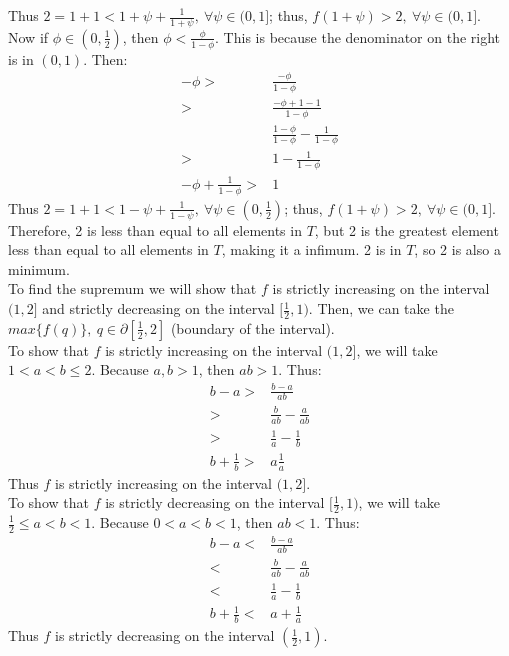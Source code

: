 \documentclass[11pt]{article}
\begin{document}
\begin{flushleft}
Thus $2 = 1 + 1 < 1 + \psi + \frac{1}{1 + \psi}, \ \forall \psi \in (0,1]$; thus, $f(1 + \psi ) > 2, \ \forall \psi \in (0, 1]$. Now if $\phi \in (0, \frac{1}{2})$, then $\phi < \frac{\phi}{1- \phi}$. This is because the denominator on the right is in $(0, 1)$. Then:
\begin{align*}
- \phi > & \frac{- \phi}{1- \phi} \\
> & \frac{- \phi +1 -1}{1- \phi} \\
& \frac{ 1 - \phi}{1- \phi} - \frac{1}{1 - \phi} \\
> & 1 - \frac{1}{1- \phi} \\
- \phi + \frac{1}{1-\phi} > & 1
\end{align*}
Thus $2 = 1 + 1 < 1 - \psi + \frac{1}{1- \psi}, \ \forall \psi \in (0, \frac{1}{2})$; thus, $f(1 + \psi ) > 2, \ \forall \psi \in (0, 1]$. Therefore, 2 is less than equal to all elements in $T$, but 2 is the greatest element less than equal to all elements in $T$, making it a infimum. 2 is in $T$, so 2 is also a minimum. \\
\bigskip
To find the supremum we will show that $f$ is strictly increasing on the interval $(1, 2]$ and strictly decreasing on the interval $[\frac{1}{2}, 1)$. Then, we can take the $max \{ f(q) \} , \ q \in \partial [\frac{1}{2}, 2]$ (boundary of the interval). \\
\bigskip
To show that $f$ is strictly increasing on the interval $(1, 2]$, we will take $1<a<b \leq 2$. Because $a,b >1$, then $ab >1$. Thus:
\begin{align*}
b-a > & \frac{b-a}{ab} \\
> & \frac{b}{ab} - \frac{a}{ab} \\
> & \frac{1}{a} - \frac{1}{b} \\
b + \frac{1}{b} > & a \frac{1}{a}
\end{align*}
Thus $f$ is strictly increasing on the interval $(1, 2]$. \\
\bigskip
To show that $f$ is strictly decreasing on the interval $[\frac{1}{2}, 1)$, we will take $\frac{1}{2} \leq a < b < 1$. Because $0< a < b < 1$, then $ab < 1$. Thus:
\begin{align*}
b-a < & \frac{b-a}{ab} \\
< & \frac{b}{ab} - \frac{a}{ab} \\
< & \frac{1}{a} - \frac{1}{b} \\
b + \frac{1}{b} < & a + \frac{1}{a}
\end{align*}
Thus $f$ is strictly decreasing on the interval $(\frac{1}{2}, 1)$.

\end{flushleft}
\end{document}
